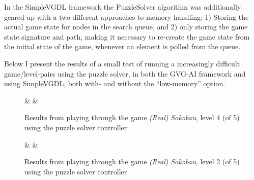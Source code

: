 \documentclass[a4paper,titlepage,final]{report}
\begin{document}
In the SimpleVGDL framework the PuzzleSolver algorithm was additionally geared up with a two different approaches to memory handling: 1) Storing the actual game state for nodes in the search queue, and 2) only storing the game state signature and path, making it necessary to re-create the game state from the initial state of the game, whenever an element is polled from the queue.

Below I present the results of a small test of running a increasingly difficult game/level-pairs using the puzzle solver, in both the GVG-AI framework and using SimpleVGDL, both with- and without the ``low-memory'' option.

\begin{figure}[!ht]
\centering
{}%
{\Framwork & \Time & \Space}%
\caption{Results from playing through the game \textit{(Real) Sokoban}, level 4 (of 5) using the puzzle solver controller}
\label{table:fastvgdlsokoban3}
\end{figure}

 \begin{figure}[!ht]
\centering
{}%
{\Framwork & \Time & \Space}%
\caption{Results from playing through the game \textit{(Real) Sokoban}, level 2 (of 5) using the puzzle solver controller}\label{table:fastvgdlsokoban1}
\end{figure}
\end{document}
